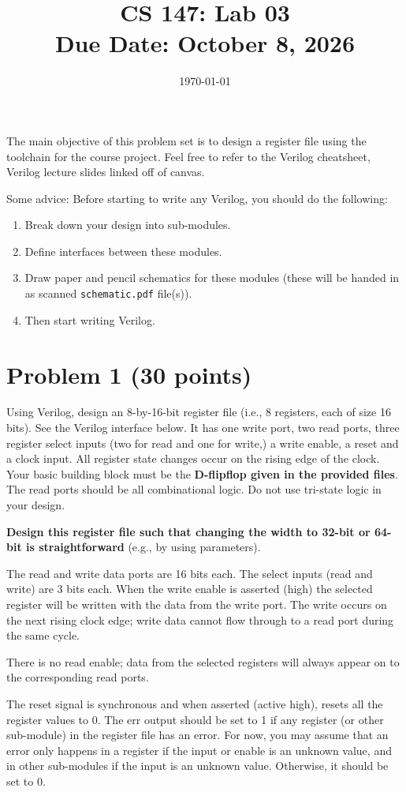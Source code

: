 \documentclass[12pt]{article}
\title{CS 147: Lab 03 \\ Due Date: October 8, 2026}
\author{}
\date{\today}
\begin{document}
\maketitle
The main objective of this problem set is to design a register file using the toolchain for the course project.  
Feel free to refer
to the Verilog cheatsheet, Verilog lecture slides linked off of canvas. 

Some advice: Before starting to write any Verilog, you should do the following:
\begin{enumerate}
\item
Break down your design into sub-modules.
\item Define interfaces between these modules.
\item Draw paper and pencil schematics for these modules (these will be handed in as scanned
\texttt{schematic.pdf} file(s)).
\item Then start writing Verilog.
\end{enumerate}

\section*{Problem 1 (30 points)}
Using Verilog, design an 8-by-16-bit register file (i.e., 8 registers, each of size 16 bits). See the Verilog
interface below. It has one write port, two read ports, three register select inputs (two for read and one for
write,) a write enable, a reset and a clock input. All register state changes occur on the rising edge of the
clock. Your basic building block must be the \textbf{D-flipflop given in the provided files}. The read ports should
be all combinational logic. Do not use tri-state logic in your design.

\textbf{Design this register file such that changing the width to 32-bit or 64-bit is straightforward} (e.g., by
using parameters).

The read and write data ports are 16 bits each. The select inputs (read and write) are 3 bits each. When the
write enable is asserted (high) the selected register will be written with the data from the write port. The
write occurs on the next rising clock edge; write data cannot flow through to a read port during the same
cycle.

There is no read enable; data from the selected registers will always appear on to the corresponding read
ports.

The reset signal is synchronous and when asserted (active high), resets all the register values to 0.
The err output should be set to 1 if any register (or other sub-module) in the register file has an error. For
now, you may assume that an error only happens in a register if the input or enable is an unknown value,
and in other sub-modules if the input is an unknown value. Otherwise, it should be set to 0.
\end{document}
